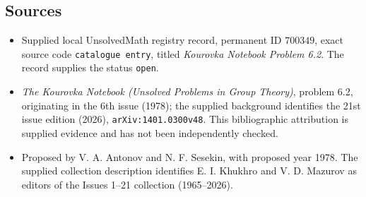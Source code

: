 \documentclass[11pt]{article}
\begin{document}
\subsection{Sources}
\begin{itemize}
\item Supplied local UnsolvedMath registry record, permanent ID \(700349\), exact source code \texttt{catalogue entry}, titled \emph{Kourovka Notebook Problem 6.2}. The record supplies the status \texttt{open}.
\item \emph{The Kourovka Notebook (Unsolved Problems in Group Theory)}, problem 6.2, originating in the 6th issue (1978); the supplied background identifies the 21st issue edition (2026), \texttt{arXiv:1401.0300v48}. This bibliographic attribution is supplied evidence and has not been independently checked.
\item Proposed by V. A. Antonov and N. F. Sesekin, with proposed year 1978. The supplied collection description identifies E. I. Khukhro and V. D. Mazurov as editors of the Issues 1--21 collection (1965--2026).
\end{itemize}
\end{document}
